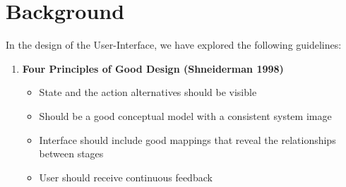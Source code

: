 \documentclass{article}
\begin{document}
\section{Background}
In the design of the User-Interface, we have explored the following guidelines:
\begin{enumerate}
\item{\bf Four Principles of Good Design (Shneiderman 1998)}
\begin{itemize}
\item State and the action alternatives should be visible
\item Should be a good conceptual model with a consistent system image
\item Interface should include good mappings that reveal the relationships between stages
\item User should receive continuous feedback
\end{itemize}


\end{enumerate}
\end{document}
